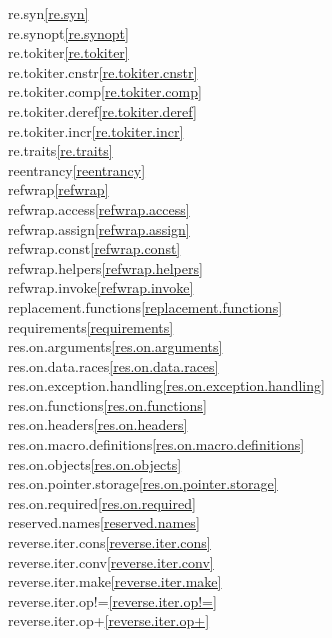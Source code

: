 \begin{multicols}{2}
re.syn\quad\ref{re.syn}\\
re.synopt\quad\ref{re.synopt}\\
re.tokiter\quad\ref{re.tokiter}\\
re.tokiter.cnstr\quad\ref{re.tokiter.cnstr}\\
re.tokiter.comp\quad\ref{re.tokiter.comp}\\
re.tokiter.deref\quad\ref{re.tokiter.deref}\\
re.tokiter.incr\quad\ref{re.tokiter.incr}\\
re.traits\quad\ref{re.traits}\\
reentrancy\quad\ref{reentrancy}\\
refwrap\quad\ref{refwrap}\\
refwrap.access\quad\ref{refwrap.access}\\
refwrap.assign\quad\ref{refwrap.assign}\\
refwrap.const\quad\ref{refwrap.const}\\
refwrap.helpers\quad\ref{refwrap.helpers}\\
refwrap.invoke\quad\ref{refwrap.invoke}\\
replacement.functions\quad\ref{replacement.functions}\\
requirements\quad\ref{requirements}\\
res.on.arguments\quad\ref{res.on.arguments}\\
res.on.data.races\quad\ref{res.on.data.races}\\
res.on.exception.handling\quad\ref{res.on.exception.handling}\\
res.on.functions\quad\ref{res.on.functions}\\
res.on.headers\quad\ref{res.on.headers}\\
res.on.macro.definitions\quad\ref{res.on.macro.definitions}\\
res.on.objects\quad\ref{res.on.objects}\\
res.on.pointer.storage\quad\ref{res.on.pointer.storage}\\
res.on.required\quad\ref{res.on.required}\\
reserved.names\quad\ref{reserved.names}\\
reverse.iter.cons\quad\ref{reverse.iter.cons}\\
reverse.iter.conv\quad\ref{reverse.iter.conv}\\
reverse.iter.make\quad\ref{reverse.iter.make}\\
reverse.iter.op!=\quad\ref{reverse.iter.op!=}\\
reverse.iter.op+\quad\ref{reverse.iter.op+}\\

\end{multicols}

